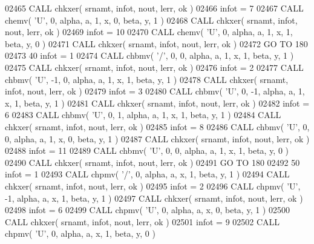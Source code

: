 \begin{DoxyCode}
02465       \textcolor{keyword}{CALL }chkxer( srnamt, infot, nout, lerr, ok )
02466       infot = 7
02467       \textcolor{keyword}{CALL }chemv( \textcolor{stringliteral}{'U'}, 0, alpha, a, 1, x, 0, beta, y, 1 )
02468       \textcolor{keyword}{CALL }chkxer( srnamt, infot, nout, lerr, ok )
02469       infot = 10
02470       \textcolor{keyword}{CALL }chemv( \textcolor{stringliteral}{'U'}, 0, alpha, a, 1, x, 1, beta, y, 0 )
02471       \textcolor{keyword}{CALL }chkxer( srnamt, infot, nout, lerr, ok )
02472       \textcolor{keywordflow}{GO TO} 180
02473    40 infot = 1
02474       \textcolor{keyword}{CALL }chbmv( \textcolor{stringliteral}{'/'}, 0, 0, alpha, a, 1, x, 1, beta, y, 1 )
02475       \textcolor{keyword}{CALL }chkxer( srnamt, infot, nout, lerr, ok )
02476       infot = 2
02477       \textcolor{keyword}{CALL }chbmv( \textcolor{stringliteral}{'U'}, -1, 0, alpha, a, 1, x, 1, beta, y, 1 )
02478       \textcolor{keyword}{CALL }chkxer( srnamt, infot, nout, lerr, ok )
02479       infot = 3
02480       \textcolor{keyword}{CALL }chbmv( \textcolor{stringliteral}{'U'}, 0, -1, alpha, a, 1, x, 1, beta, y, 1 )
02481       \textcolor{keyword}{CALL }chkxer( srnamt, infot, nout, lerr, ok )
02482       infot = 6
02483       \textcolor{keyword}{CALL }chbmv( \textcolor{stringliteral}{'U'}, 0, 1, alpha, a, 1, x, 1, beta, y, 1 )
02484       \textcolor{keyword}{CALL }chkxer( srnamt, infot, nout, lerr, ok )
02485       infot = 8
02486       \textcolor{keyword}{CALL }chbmv( \textcolor{stringliteral}{'U'}, 0, 0, alpha, a, 1, x, 0, beta, y, 1 )
02487       \textcolor{keyword}{CALL }chkxer( srnamt, infot, nout, lerr, ok )
02488       infot = 11
02489       \textcolor{keyword}{CALL }chbmv( \textcolor{stringliteral}{'U'}, 0, 0, alpha, a, 1, x, 1, beta, y, 0 )
02490       \textcolor{keyword}{CALL }chkxer( srnamt, infot, nout, lerr, ok )
02491       \textcolor{keywordflow}{GO TO} 180
02492    50 infot = 1
02493       \textcolor{keyword}{CALL }chpmv( \textcolor{stringliteral}{'/'}, 0, alpha, a, x, 1, beta, y, 1 )
02494       \textcolor{keyword}{CALL }chkxer( srnamt, infot, nout, lerr, ok )
02495       infot = 2
02496       \textcolor{keyword}{CALL }chpmv( \textcolor{stringliteral}{'U'}, -1, alpha, a, x, 1, beta, y, 1 )
02497       \textcolor{keyword}{CALL }chkxer( srnamt, infot, nout, lerr, ok )
02498       infot = 6
02499       \textcolor{keyword}{CALL }chpmv( \textcolor{stringliteral}{'U'}, 0, alpha, a, x, 0, beta, y, 1 )
02500       \textcolor{keyword}{CALL }chkxer( srnamt, infot, nout, lerr, ok )
02501       infot = 9
02502       \textcolor{keyword}{CALL }chpmv( \textcolor{stringliteral}{'U'}, 0, alpha, a, x, 1, beta, y, 0 )

\end{DoxyCode}
